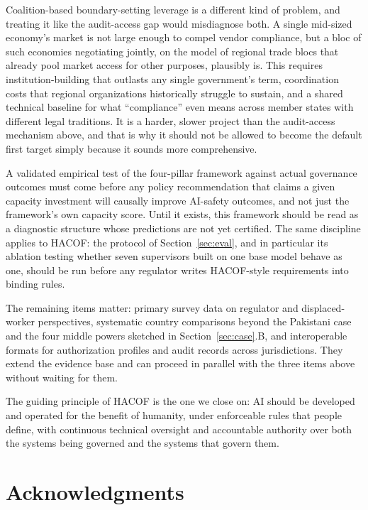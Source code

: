 \documentclass{ieeeaccess}
\newcommand{\hacof}{HACOF}
\begin{document}
Coalition-based boundary-setting leverage is a different kind of problem, and treating it like the audit-access gap would misdiagnose both. A single mid-sized economy's market is not large enough to compel vendor compliance, but a bloc of such economies negotiating jointly, on the model of regional trade blocs that already pool market access for other purposes, plausibly is. This requires institution-building that outlasts any single government's term, coordination costs that regional organizations historically struggle to sustain, and a shared technical baseline for what ``compliance'' even means across member states with different legal traditions. It is a harder, slower project than the audit-access mechanism above, and that is why it should not be allowed to become the default first target simply because it sounds more comprehensive.

A validated empirical test of the four-pillar framework against actual governance outcomes must come before any policy recommendation that claims a given capacity investment will causally improve AI-safety outcomes, and not just the framework's own capacity score. Until it exists, this framework should be read as a diagnostic structure whose predictions are not yet certified. The same discipline applies to \hacof{}: the protocol of Section~\ref{sec:eval}, and in particular its ablation testing whether seven supervisors built on one base model behave as one, should be run before any regulator writes \hacof{}-style requirements into binding rules.

The remaining items matter: primary survey data on regulator and displaced-worker perspectives, systematic country comparisons beyond the Pakistani case and the four middle powers sketched in Section~\ref{sec:case}.B, and interoperable formats for authorization profiles and audit records across jurisdictions. They extend the evidence base and can proceed in parallel with the three items above without waiting for them.

The guiding principle of \hacof{} is the one we close on: AI should be developed and operated for the benefit of humanity, under enforceable rules that people define, with continuous technical oversight and accountable authority over both the systems being governed and the systems that govern them.

\section*{Acknowledgments}
\end{document}
